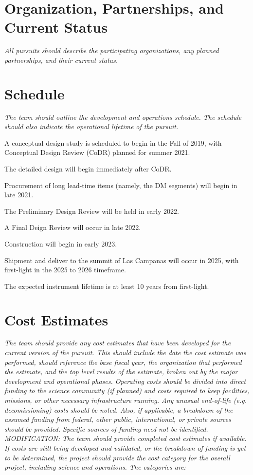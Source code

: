 \documentclass[12pt,preprint]{aastex}
\begin{document}
 




\section{Organization, Partnerships, and Current Status}  
\textit{All pursuits should describe the participating
organizations, any planned partnerships, and their current status.}

\section{Schedule}
\textit{The team should outline the development and operations schedule. The schedule
should also indicate the operational lifetime of the pursuit.}

A conceptual design study is scheduled to begin in the Fall of 2019, with Conceptual Design Review (CoDR) planned for summer 2021.  

The detailed design will begin immediately after CoDR.

Procurement of long lead-time items (namely, the DM segments) will begin in late 2021.  

The Preliminary Design Review will be held in early 2022.

A Final Deign Review will occur in late 2022.

Construction will begin in early 2023.

Shipment and deliver to the summit of Las Campanas will occur in 2025, with first-light in the 2025 to 2026 timeframe.

The expected instrument lifetime is at least 10 years from first-light.  

\section{Cost Estimates}
\textit{The team should provide any cost estimates that have been developed for the
current version of the pursuit. This should include the date the cost estimate was performed,
should reference the base fiscal year, the organization that performed the estimate, and the top
level results of the estimate, broken out by the major development and operational phases.
Operating costs should be divided into direct funding to the science community (if planned) and
costs required to keep facilities, missions, or other necessary infrastructure running. Any
unusual end-of-life (e.g. decomissioning) costs should be noted. Also, if applicable, a
breakdown of the assumed funding from federal, other public, international, or private sources
should be provided. Specific sources of funding need not be identified.
MODIFICATION: The team should provide completed cost estimates if available. If costs are
still being developed and validated, or the breakdown of funding is yet to be determined, the
project should provide the cost category for the overall project, including science and
operations. The categories are:}
\end{document}
